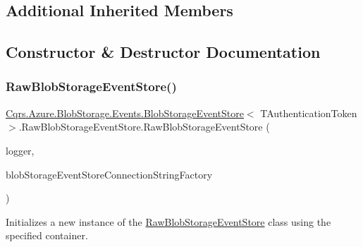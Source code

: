 \subsection*{Additional Inherited Members}


\subsection{Constructor \& Destructor Documentation}
\mbox{\label{classCqrs_1_1Azure_1_1BlobStorage_1_1Events_1_1BlobStorageEventStore_1_1RawBlobStorageEventStore_a42832e52a20eeb7012526624181f457c}} 
\subsubsection{\texorpdfstring{Raw\+Blob\+Storage\+Event\+Store()}{RawBlobStorageEventStore()}}
{\footnotesize\ttfamily \hyperlink{classCqrs_1_1Azure_1_1BlobStorage_1_1Events_1_1BlobStorageEventStore}{Cqrs.\+Azure.\+Blob\+Storage.\+Events.\+Blob\+Storage\+Event\+Store}$<$ T\+Authentication\+Token $>$.Raw\+Blob\+Storage\+Event\+Store.\+Raw\+Blob\+Storage\+Event\+Store (\begin{DoxyParamCaption}\item[{I\+Logger}]{logger,  }\item[{\hyperlink{interfaceCqrs_1_1Azure_1_1BlobStorage_1_1IBlobStorageStoreConnectionStringFactory}{I\+Blob\+Storage\+Store\+Connection\+String\+Factory}}]{blob\+Storage\+Event\+Store\+Connection\+String\+Factory }\end{DoxyParamCaption})}



Initializes a new instance of the \hyperlink{classCqrs_1_1Azure_1_1BlobStorage_1_1Events_1_1BlobStorageEventStore_1_1RawBlobStorageEventStore}{Raw\+Blob\+Storage\+Event\+Store} class using the specified container. 



